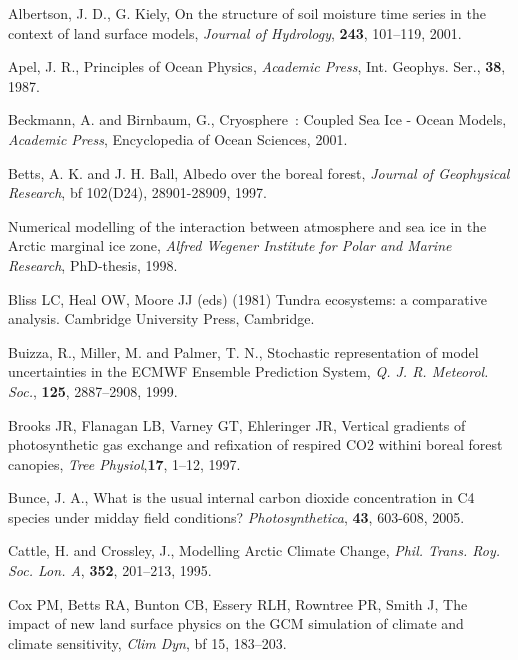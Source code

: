 \begin{thebibliography}{}

 Albertson, J. D., G. Kiely, On the structure of soil moisture time series
 in the context of land surface models, {\it Journal of Hydrology},
 {\bf 243}, 101--119, 2001.

 Apel, J. R.,
 Principles of Ocean Physics,
 {\em Academic Press},  Int. Geophys. Ser., {\bf 38}, 1987.

 Beckmann, A. and Birnbaum, G.,
 Cryosphere~: Coupled Sea Ice - Ocean Models,
 {\em Academic Press}, Encyclopedia of Ocean Sciences, 2001.

Betts, A. K. and J. H. Ball,
 Albedo over the boreal forest, {\it Journal of Geophysical Research},
 {bf 102}(D24), 28901-28909, 1997. 

 Numerical modelling of the interaction between atmosphere and sea
 ice in the Arctic marginal ice zone,
 {\em Alfred Wegener Institute for Polar and Marine Research},
 PhD-thesis, 1998.

 Bliss LC, Heal OW, Moore JJ (eds) (1981) Tundra ecosystems:
 a comparative analysis. Cambridge University Press, Cambridge.

 Buizza, R., Miller, M. and Palmer, T. N.,  Stochastic
 representation of model uncertainties in the ECMWF Ensemble
 Prediction System, {\em Q. J. R. Meteorol. Soc.}, {\bf 125},
 2887--2908, 1999.

 Brooks JR, Flanagan LB, Varney GT, Ehleringer JR, Vertical gradients
 of photosynthetic gas exchange and refixation of respired CO2 withini
 boreal forest canopies, {\it Tree Physiol},{\bf 17}, 1--12, 1997.

 Bunce, J. A., What is the usual internal carbon dioxide concentration
 in C4 species under midday field conditions? {\it Photosynthetica},
 {\bf 43}, 603-608, 2005.

 Cattle, H. and Crossley, J.,
 Modelling Arctic Climate Change,
 {\em Phil. Trans. Roy. Soc. Lon. A}, {\bf 352}, 201--213, 1995.

 Cox PM, Betts RA, Bunton CB, Essery RLH, Rowntree PR, Smith
 J, The impact of new land surface physics on the GCM simulation
 of climate and climate sensitivity, {\it Clim Dyn}, {bf 15}, 183--203.


\end{thebibliography}
